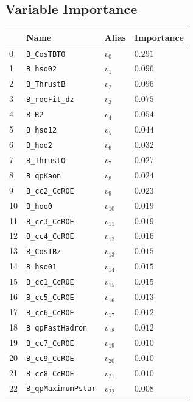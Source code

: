 \subsection{Variable Importance}

\begin{longtable}{| p{} | p{} | p{} |p{} |}
\hline
& Name & Alias & Importance \\ \hline
0 &\texttt{B\_CosTBTO} & $v_{0}$ & $0.291$ \\ \hline
1 &\texttt{B\_hso02} & $v_{1}$ & $0.096$ \\ \hline
2 &\texttt{B\_ThrustB} & $v_{2}$ & $0.096$ \\ \hline
3 &\texttt{B\_roeFit\_dz} & $v_{3}$ & $0.075$ \\ \hline
4 &\texttt{B\_R2} & $v_{4}$ & $0.054$ \\ \hline
5 &\texttt{B\_hso12} & $v_{5}$ & $0.044$ \\ \hline
6 &\texttt{B\_hoo2} & $v_{6}$ & $0.032$ \\ \hline
7 &\texttt{B\_ThrustO} & $v_{7}$ & $0.027$ \\ \hline
8 &\texttt{B\_qpKaon} & $v_{8}$ & $0.024$ \\ \hline
9 &\texttt{B\_cc2\_CcROE} & $v_{9}$ & $0.023$ \\ \hline
10 &\texttt{B\_hoo0} & $v_{10}$ & $0.019$ \\ \hline
11 &\texttt{B\_cc3\_CcROE} & $v_{11}$ & $0.019$ \\ \hline
12 &\texttt{B\_cc4\_CcROE} & $v_{12}$ & $0.016$ \\ \hline
13 &\texttt{B\_CosTBz} & $v_{13}$ & $0.015$ \\ \hline
14 &\texttt{B\_hso01} & $v_{14}$ & $0.015$ \\ \hline
15 &\texttt{B\_cc1\_CcROE} & $v_{15}$ & $0.015$ \\ \hline
16 &\texttt{B\_cc5\_CcROE} & $v_{16}$ & $0.013$ \\ \hline
17 &\texttt{B\_cc6\_CcROE} & $v_{17}$ & $0.012$ \\ \hline
18 &\texttt{B\_qpFastHadron} & $v_{18}$ & $0.012$ \\ \hline
19 &\texttt{B\_cc7\_CcROE} & $v_{19}$ & $0.010$ \\ \hline
20 &\texttt{B\_cc9\_CcROE} & $v_{20}$ & $0.010$ \\ \hline
21 &\texttt{B\_cc8\_CcROE} & $v_{21}$ & $0.010$ \\ \hline
22 &\texttt{B\_qpMaximumPstar} & $v_{22}$ & $0.008$ \\ \hline

\end{longtable}
